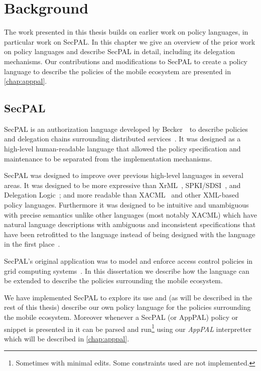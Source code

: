 \documentclass[thesis.tex]{subfiles}
\begin{document}
\chapter{Background}

The work presented in this thesis builds on earlier work on policy languages, in
particular work on SecPAL. In this chapter we give an overview of the prior work
on policy languages and describe SecPAL in detail, including its delegation
mechanisms. Our contributions and modifications to SecPAL to create a policy
language to describe the policies of the mobile ecosystem are presented in
\autoref{chap:apppal}.

\section{SecPAL}

SecPAL is an authorization language developed by Becker~\etal~to
describe policies and delegation chains surrounding distributed
services~\cite{becker_secpal:_2006}. It was designed as a high-level
human-readable language that allowed the policy specification and
maintenance to be separated from the implementation mechanisms.

SecPAL was designed to improve over previous high-level languages in several
areas. It was designed to be more expressive than
XrML~\cite{kolovski_logic-based_2007}, SPKI/SDSI~\cite{ellison_spki_1999}, and
Delegation Logic~\cite{li_delegation_2003}; and more readable than
XACML~\cite{oasis_extensible_2013} and other XML-based policy languages.
Furthermore it was designed to be intuitive and unambiguous with precise
semantics unlike other languages (most notably XACML) which have natural
language descriptions with ambiguous and inconsistent specifications that have
been retrofitted to the language instead of being designed with the language in
the first
place~\cite{bryans_reasoning_2005,ramli_logic_2014,masi_formalisation_2012}.

SecPAL's original application was to model and enforce access control
policies in grid computing systems~\cite{becker_secpal:_2006}.  In
this dissertation we describe how the language can be extended to
describe the policies surrounding the mobile ecosystem.

We have implemented SecPAL to explore its use and (as will be described in the
rest of this thesis) describe our own policy language for the policies
surrounding the mobile ecosystem. Moreover whenever a SecPAL (or AppPAL) policy
or snippet is presented in  it can be parsed
and run\footnote{Sometimes with minimal edits. Some constraints used are not
implemented.} using our \emph{AppPAL} interpretter which will be
described in \autoref{chap:apppal}.
\end{document}
